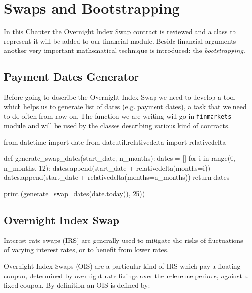 \chapter{Swaps and Bootstrapping}\label{sec:swaps-and-bootstrapping}

In this Chapter the Overnight Index Swap contract is reviewed and a class to represent it will be added to our financial module. Beside financial arguments another very important mathematical technique is introduced: the \emph{bootstrapping}.

\section{Payment Dates Generator}
Before going to describe the Overnight Index Swap we need to develop a tool which helps us to generate list of dates (e.g. payment dates), a task that we need to do often from now on. 
The function we are writing will go in \texttt{finmarkets} module and will be used by the classes describing various kind of contracts.

\begin{ipython}
from datetime import date
from dateutil.relativedelta import relativedelta

def generate_swap_dates(start_date, n_months):
    dates = []
    for i in range(0, n_months, 12):
        dates.append(start_date + relativedelta(months=i))
    dates.append(start_date + relativedelta(months=n_months))
    return dates

print (generate_swap_dates(date.today(), 25))
\end{ipython}
\begin{ioutput}
\end{ioutput}

\section{Overnight Index Swap}\label{overnight-index-swap}

Interest rate swaps (IRS) are generally used to mitigate the risks of
fluctuations of varying interest rates, or to benefit from lower rates.

Overnight Index Swaps (OIS) are a particular kind of IRS which pay a
floating coupon, determined by overnight rate fixings over the reference
periods, against a fixed coupon. By definition an OIS is defined by:

